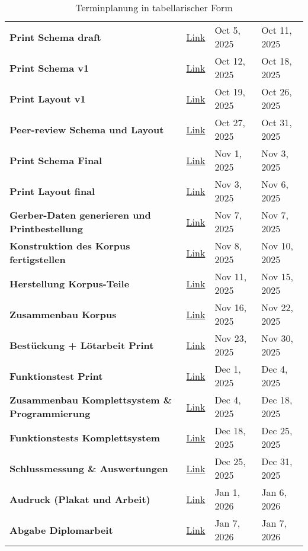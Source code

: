 \begin{table}[H]
\begin{tabularx}{412pt}{|l|l|l|l|}
		\textbf{Print Schema draft} & \href{https://github.com/Violabitch5/Nathophone\_elec/issues/4}{Link} & Oct 5, 2025 & Oct 11, 2025 \\ 
		\textbf{Print Schema v1} & \href{https://github.com/Violabitch5/Nathophone\_elec/issues/5}{Link} & Oct 12, 2025 & Oct 18, 2025 \\ 
		\textbf{Print Layout v1} & \href{https://github.com/Violabitch5/Nathophone\_elec/issues/6}{Link} & Oct 19, 2025 & Oct 26, 2025 \\ 
		\textbf{Peer-review Schema und Layout} & \href{https://github.com/Violabitch5/Nathophone\_elec/issues/7}{Link} & Oct 27, 2025 & Oct 31, 2025 \\ 
		\textbf{Print Schema Final} & \href{https://github.com/Violabitch5/Nathophone\_elec/issues/8}{Link} & Nov 1, 2025 & Nov 3, 2025 \\ 
		\textbf{Print Layout final} & \href{https://github.com/Violabitch5/Nathophone\_elec/issues/9}{Link} & Nov 3, 2025 & Nov 6, 2025 \\ 
		\textbf{Gerber-Daten generieren und Printbestellung} & \href{https://github.com/Violabitch5/Nathophone\_elec/issues/10}{Link} & Nov 7, 2025 & Nov 7, 2025 \\ 
		\textbf{Konstruktion des Korpus fertigstellen} & \href{https://github.com/Violabitch5/Nathophone\_mech/issues/1}{Link} & Nov 8, 2025 & Nov 10, 2025 \\ 
		\textbf{Herstellung Korpus-Teile} & \href{https://github.com/Violabitch5/Nathophone\_mech/issues/2}{Link} & Nov 11, 2025 & Nov 15, 2025 \\ 
		\textbf{Zusammenbau Korpus} & \href{https://github.com/Violabitch5/Nathophone\_mech/issues/3}{Link} & Nov 16, 2025 & Nov 22, 2025 \\ 
		\textbf{Bestückung + Lötarbeit Print} & \href{https://github.com/Violabitch5/Nathophone\_elec/issues/11}{Link} & Nov 23, 2025 & Nov 30, 2025 \\ 
		\textbf{Funktionstest Print} & \href{https://github.com/Violabitch5/Nathophone\_elec/issues/12}{Link} & Dec 1, 2025 & Dec 4, 2025 \\ 
		\textbf{Zusammenbau Komplettsystem \& Programmierung} & \href{https://github.com/Violabitch5/Nathophone\_mech/issues/4}{Link} & Dec 4, 2025 & Dec 18, 2025 \\ 
		\textbf{Funktionstests Komplettsystem} & \href{https://github.com/Violabitch5/Nathophone\_elec/issues/13}{Link} & Dec 18, 2025 & Dec 25, 2025 \\ 
		\textbf{Schlussmessung \& Auswertungen} & \href{https://github.com/Violabitch5/Nathophone\_elec/issues/14}{Link} & Dec 25, 2025 & Dec 31, 2025 \\ 
		\hdashline
		\textbf{Audruck (Plakat und Arbeit)} & \href{https://github.com/Violabitch5/Nathophone\_doc/issues/8}{Link} & Jan 1, 2026 & Jan 6, 2026 \\ 
		\textbf{Abgabe Diplomarbeit} & \href{https://github.com/Violabitch5/Nathophone\_doc/issues/2}{Link} & Jan 7, 2026 & Jan 7, 2026
	\end{tabularx}
	\caption{Terminplanung in tabellarischer Form}
	\label{terminplan}
\end{table}